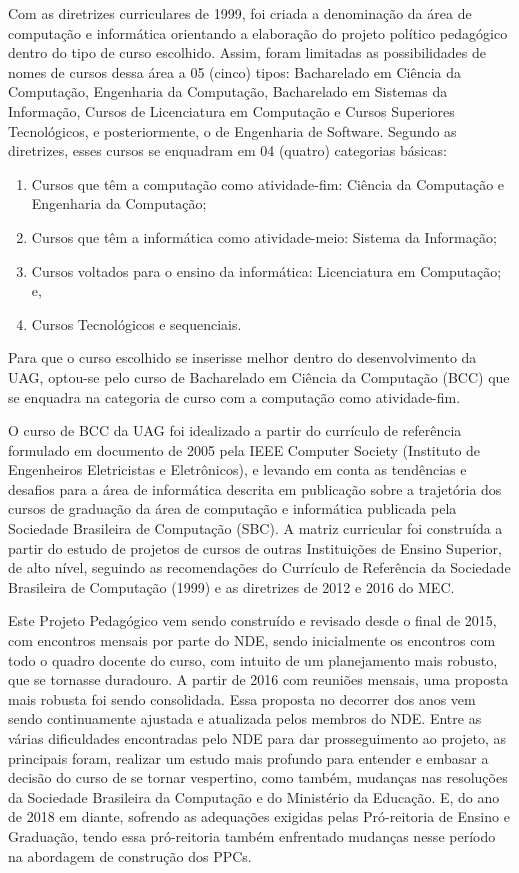 \documentclass[
	12pt,				%
	openright,			%
  oneside,     %
	a4paper,			%
	chapter=TITLE,		%
	english,			%
	french,				%
	spanish,			%
	brazil				%
	]{abntex2}
\begin{document}
Com as diretrizes curriculares de 1999, foi criada a denominação da área de computação e informática orientando a elaboração do projeto político pedagógico dentro do tipo de curso escolhido. Assim, foram limitadas as possibilidades de nomes de cursos dessa área a 05 (cinco) tipos: Bacharelado em Ciência da Computação, Engenharia da Computação, Bacharelado em Sistemas da Informação, Cursos de Licenciatura em Computação e Cursos Superiores Tecnológicos, e posteriormente, o de Engenharia de Software. Segundo as diretrizes, esses cursos se enquadram em 04 (quatro) categorias básicas:

\begin{enumerate}
    \item Cursos que têm a computação como atividade-fim: Ciência da Computação e Engenharia da Computação;
    \item Cursos que têm a informática como atividade-meio:  Sistema da Informação;
    \item Cursos voltados para o ensino da informática: Licenciatura em Computação; e,
    \item Cursos Tecnológicos e sequenciais.
\end{enumerate}

Para que o curso escolhido se inserisse melhor dentro do desenvolvimento da UAG, optou-se pelo curso de Bacharelado em Ciência da Computação (BCC) que se enquadra na categoria de curso com a computação como atividade-fim.

O curso de BCC da UAG foi idealizado a partir do currículo de referência formulado em documento de 2005 pela IEEE Computer Society (Instituto de Engenheiros Eletricistas e Eletrônicos), e levando em conta as tendências e desafios para a área de informática descrita em publicação sobre a trajetória dos cursos de graduação da área de computação e informática publicada pela Sociedade Brasileira de Computação (SBC). A matriz curricular foi construída a partir do estudo de projetos de cursos de outras Instituições de Ensino Superior, de alto nível, seguindo as recomendações do Currículo de Referência da Sociedade Brasileira de Computação (1999) e as diretrizes de 2012 e 2016 do MEC.

Este Projeto Pedagógico vem sendo construído e revisado desde o final de 2015, com encontros mensais por parte do NDE, sendo inicialmente os encontros com todo o quadro docente do curso, com intuito de um planejamento mais robusto, que se tornasse duradouro. A partir de 2016 com reuniões mensais, uma proposta mais robusta foi sendo consolidada. Essa proposta no decorrer dos anos vem sendo continuamente ajustada e atualizada pelos membros do NDE. Entre as várias dificuldades encontradas pelo NDE para dar prosseguimento ao projeto, as principais foram, realizar um estudo mais profundo para entender e embasar a decisão do curso de se tornar vespertino, como também, mudanças nas resoluções da Sociedade Brasileira da Computação e do Ministério da Educação. E, do ano de 2018 em diante, sofrendo as adequações exigidas pelas Pró-reitoria de Ensino e Graduação, tendo essa pró-reitoria também enfrentado mudanças nesse período na abordagem de construção dos PPCs.
\end{document}
